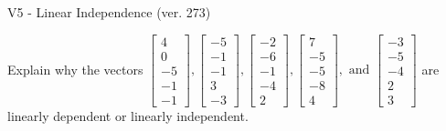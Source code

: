 \begin{exercise}
  \begin{exerciseTitle}V5 - Linear Independence (ver. 273)\end{exerciseTitle}
  \begin{exerciseStatement}
    Explain why the vectors \(\left[\begin{array}{r}
4 \\
0 \\
-5 \\
-1 \\
-1
\end{array}\right] , \left[\begin{array}{r}
-5 \\
-1 \\
-1 \\
3 \\
-3
\end{array}\right] , \left[\begin{array}{r}
-2 \\
-6 \\
-1 \\
-4 \\
2
\end{array}\right] , \left[\begin{array}{r}
7 \\
-5 \\
-5 \\
-8 \\
4
\end{array}\right] , \text{ and } \left[\begin{array}{r}
-3 \\
-5 \\
-4 \\
2 \\
3
\end{array}\right]\) are linearly dependent or linearly independent.	



\end{exerciseStatement}
\end{exercise}
